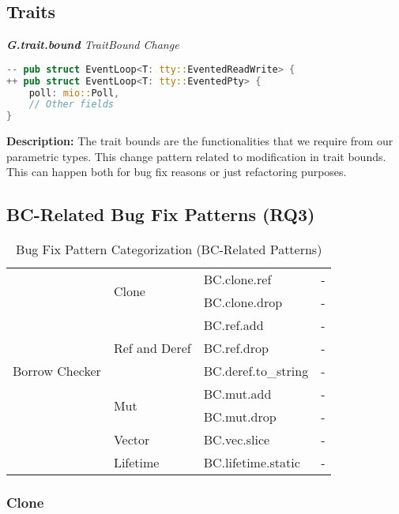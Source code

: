 \subsection{Traits}
\noindent \textit{ \textbf{G.trait.bound} TraitBound Change}

\begin{lstlisting}[language=Rust, style=colouredRust]
-- pub struct EventLoop<T: tty::EventedReadWrite> {
++ pub struct EventLoop<T: tty::EventedPty> {
    poll: mio::Poll,
    // Other fields
}

\end{lstlisting}

\noindent \textbf{Description:} The trait bounds are the functionalities that we require from our parametric types. This change pattern related to modification in trait bounds. This can happen both for bug fix reasons or just refactoring purposes.

\subsection{\label{sec:bc_patterns}BC-Related Bug Fix Patterns (RQ3)}


\begin{table}[]
\begin{tabular}{|l|l|l|l|}
\hline
\multirow{9}{*}{Borrow Checker} &
\multirow{2}{*}{Clone}                                         & BC.clone.ref & - \\
& & BC.clone.drop & -   
\\\cline{2-3}
& \multirow{3}{*}{Ref and Deref} & BC.ref.add & - \\
& & BC.ref.drop & - \\
& & BC.deref.to\_string  & -                                            \\\cline{2-3}
& \multirow{2}{*}{Mut} & BC.mut.add  & - \\
& & BC.mut.drop  & -                                \\\cline{2-3}
& Vector & BC.vec.slice  & -                                    \\\cline{2-3}
& \multirow{1}{*}{Lifetime}      
& BC.lifetime.static  & -
\\
\hline
\end{tabular}
\caption{\label{table:bc}Bug Fix Pattern Categorization (BC-Related Patterns)}
\end{table}
    

\subsubsection{Clone}

